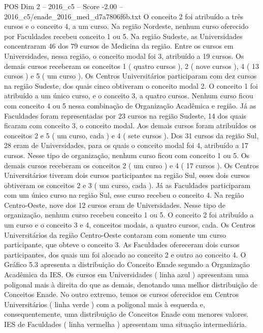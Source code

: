 \begin{textsample}{POS Dim 2 – 2016\_c5 – Score -2.00 – 2016\_c5/enade\_2016\_med\_d7a7806f6b.txt}
O conceito 2 foi atribuído a três cursos e o conceito 4, a um curso.
Na região Nordeste, nenhum curso oferecido por Faculdades recebeu conceito 1 ou 5.
Na região Sudeste, as Universidades concentraram 46 dos 79 cursos de Medicina da região.
Entre os cursos em Universidades, nessa região, o conceito modal foi 3, atribuído a 19 cursos.
Os demais cursos receberam os conceitos 1 ( quatro cursos ), 2 ( nove cursos ), 4 ( 13 cursos ) e 5 ( um curso ).
Os Centros Universitários participaram com dez cursos na região Sudeste, dos quais cinco obtiveram o conceito modal 2.
O conceito 1 foi atribuído a um único curso, e o conceito 3, a quatro cursos.
Nenhum curso ficou com conceito 4 ou 5 nessa combinação de Organização Acadêmica e região.
Já as Faculdades foram representadas por 23 cursos na região Sudeste, 14 dos quais ficaram com conceito 3, o conceito modal.
Aos demais cursos foram atribuídos os conceitos 2 e 5 ( um curso, cada ) e 4 ( sete cursos ).
Dos 31 cursos da região Sul, 28 eram de Universidades, para os quais o conceito modal foi 4, atribuído a 17 cursos.
Nesse tipo de organização, nenhum curso ficou com conceito 1 ou 5.
Os demais cursos receberam os conceitos 2 ( um curso ) e 4 ( 17 cursos ).
Os Centros Universitários tiveram dois cursos participantes na região Sul, esses dois cursos obtiveram os conceitos 2 e 3 ( um curso, cada ).
Já as Faculdades participaram com um único curso na região Sul, esse curso recebeu o conceito 4.
Na região Centro-Oeste, nove dos 12 cursos eram de Universidades.
Nesse tipo de organização, nenhum curso recebeu conceito 1 ou 5.
O conceito 2 foi atribuído a um curso e o conceito 3 e 4, conceitos modais, a quatro cursos, cada.
Os Centros Universitários da região Centro-Oeste contaram com somente um curso participante, que obteve o conceito 3.
As Faculdades ofereceram dois cursos participantes, dos quais um foi alocado ao conceito 2 e outro ao conceito 4.
O Gráfico 5.3 apresenta a distribuição do Conceito Enade segundo a Organização Acadêmica da IES.
Os cursos em Universidades ( linha azul ) apresentam uma poligonal mais à direita do que as demais, denotando uma melhor distribuição de Conceitos Enade.
No outro extremo, temos os cursos oferecidos em Centros Universitários ( linha verde ) com a poligonal mais à esquerda e, consequentemente, uma distribuição de Conceitos Enade com menores valores.
IES de Faculdades ( linha vermelha ) apresentam uma situação intermediária.

\end{textsample}

